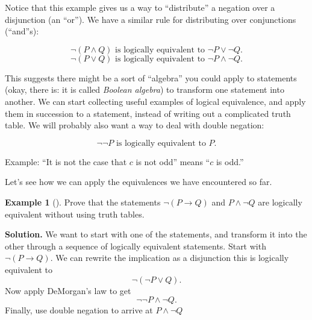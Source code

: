 \documentclass[10pt,]{book}
\theoremstyle{plain}
\theoremstyle{definition}
\theoremstyle{definition}
\newtheorem{example}[theorem]{Example}
\theoremstyle{definition}
\numberwithin{equation}{chapter}
\def\imp{\rightarrow}
\begin{document}
Notice that this example gives us a way to ``distribute'' a negation over a disjunction (an ``or''). We have a similar rule for distributing over conjunctions (``and''s):%
\begin{assemblage}\label{assemblage-22}
\hypertarget{p-2306}{}%
%
\begin{equation*}
\neg(P \wedge Q) \text{ is logically equivalent to } \neg P \vee \neg Q.
\end{equation*}
%
\begin{equation*}
\neg(P \vee Q) \text{ is logically equivalent to } \neg P \wedge \neg Q.
\end{equation*}
%
\end{assemblage}
\hypertarget{p-2307}{}%
This suggests there might be a sort of ``algebra'' you could apply to statements (okay, there is: it is called \emph{Boolean algebra}) to transform one statement into another. We can start collecting useful examples of logical equivalence, and apply them in succession to a statement, instead of writing out a complicated truth table. We will probably also want a way to deal with double negation:%
\begin{assemblage}\label{assemblage-23}
\hypertarget{p-2308}{}%
%
\begin{equation*}
\neg \neg P \mbox{ is logically equivalent to } P.
\end{equation*}
%
\par
\hypertarget{p-2309}{}%
Example: ``It is not the case that \(c\) is not odd'' means ``\(c\) is odd.''%
\end{assemblage}
\hypertarget{p-2310}{}%
Let's see how we can apply the equivalences we have encountered so far.%
\begin{example}[]\label{example-38}
\hypertarget{p-2311}{}%
Prove that the statements \(\neg(P \imp Q)\) and \(P\wedge \neg Q\) are logically equivalent without using truth tables.%
\par\smallskip%
\noindent\textbf{Solution.}\hypertarget{solution-277}{}\quad%
\hypertarget{p-2312}{}%
We want to start with one of the statements, and transform it into the other through a sequence of logically equivalent statements. Start with \(\neg(P \imp Q)\). We can rewrite the implication as a disjunction this is logically equivalent to%
\begin{equation*}
\neg(\neg P \vee Q).
\end{equation*}
Now apply DeMorgan's law to get%
\begin{equation*}
\neg\neg P \wedge \neg Q.
\end{equation*}
Finally, use double negation to arrive at \(P \wedge \neg Q\)%
\end{example}
\end{document}
